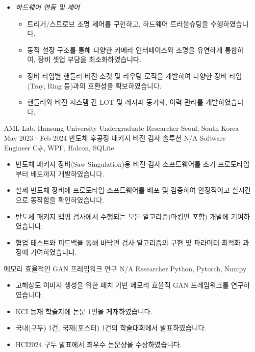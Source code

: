 \documentclass[10pt, a4paper]{cvhari}
\begin{document}
    \begin{itemize}
        \item \textsl{하드웨어 연동 및 제어}
        \begin{itemize}
            \item 트리거/스트로브 조명 제어를 구현하고, 하드웨어 트러블슈팅을 수행하였습니다.
            \item 동적 설정 구조를 통해 다양한 카메라 인터페이스와 조명을 유연하게 통합하여, 장비 셋업 부담을 최소화하였습니다.
            \item 장비 타입별 핸들러-비전 소켓 및 라우팅 로직을 개발하여 다양한 장비 타입(Tray, Ring 등)과의 호환성을 확보하였습니다.
            \item 핸들러와 비전 시스템 간 LOT 및 레시피 동기화, 이력 관리를 개발하였습니다.
        \end{itemize}
    \end{itemize} 
        
\smallskip
\divider
\smallskip

    \company
        {AML Lab. Hansung University}
        {Undergraduate Researcher}
        {Seoul, South Korea}
        {May 2023 - Feb 2024}
        \project
            {반도체 후공정 패키지 비전 검사 솔루션}
            {N/A}
            {Software Engineer}
            {C\#, WPF, Halcon, SQLite}
        \begin{itemize}
            \item 반도체 패키지 장비(Saw Singulation)용 비전 검사 소프트웨어를 초기 프로토타입부터 배포까지 개발하였습니다.
            \item 실제 반도체 장비에 프로토타입 소프트웨어를 배포 및 검증하여 안정적이고 실시간으로 동작함을 확인하였습니다.
            \item 반도체 패키지 맵핑 검사에서 수행되는 모든 알고리즘(마킹면 포함) 개발에 기여하였습니다.
            \item 협업 테스트와 피드백을 통해 바닥면 검사 알고리즘의 구현 및 파라미터 최적화 과정에 기여하였습니다.
        \end{itemize} 

        
        \project
            {메모리 효율적인 GAN 프레임워크 연구}
            {N/A}
            {Researcher}
            {Python, Pytorch, Numpy}
        
        \begin{itemize}
            \item 고해상도 이미지 생성을 위한 패치 기반 메모리 효율적 GAN 프레임워크를 연구하였습니다.
            \item KCI 등재 학술지에 논문 1편을 게재하였습니다.
            \item 국내(구두) 1건, 국제(포스터) 1건의 학술대회에서 발표하였습니다.
            \item HCI2024 구두 발표에서 최우수 논문상을 수상하였습니다.
        \end{itemize} 
\end{document}
